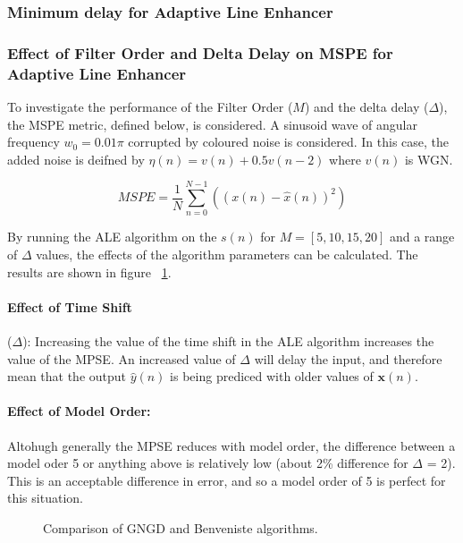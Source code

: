 \documentclass[main.tex]{subfiles}
\begin{document}
\subsubsection{Minimum delay for Adaptive Line Enhancer}


\subsubsection{Effect of Filter Order and Delta Delay on MSPE for Adaptive Line Enhancer}

To investigate the performance of the Filter Order ($M$) and the delta delay ($\Delta$), the MSPE metric, defined below, is considered. A sinusoid wave of angular frequency $w_0 = 0.01\pi$ corrupted by coloured noise is considered. In this case, the added noise is deifned by $\eta(n) = v(n) + 0.5v(n-2)$ where $v(n)$ is WGN. 

\begin{equation}
	MSPE = \frac{1}{N}\sum_{n=0}^{N-1}((x(n)-\hat{x}(n))^2)
\end{equation}

By running the ALE algorithm on the $s(n)$ for $M=[5,10,15,20]$ and a range of $\Delta$ values, the effects of the algorithm parameters can be calculated. The results are shown in figure ~\ref{fig:q3_3_b}.

\paragraph*{Effect of Time Shift}($\Delta$): Increasing the value of the time shift in the ALE algorithm increases the value of the MPSE. An increased value of $\Delta$ will delay the input, and therefore mean that the output $\hat{y}(n)$ is being prediced with older values of $\textbf{x}(n)$. %

\paragraph*{Effect of Model Order:} Altohugh generally the MPSE reduces with model order, the difference between a model oder 5 or anything above is relatively low (about 2\% difference for $\Delta$ = 2). This is an acceptable difference in error, and so a model order of 5 is perfect for this situation.

\begin{figure}[H]
	\centering 
	\resizebox{0.7\textwidth}{!}{}
	\caption{Comparison of GNGD and Benveniste algorithms.}
	\label{fig:q3_3_b}
\end{figure}
\end{document}
